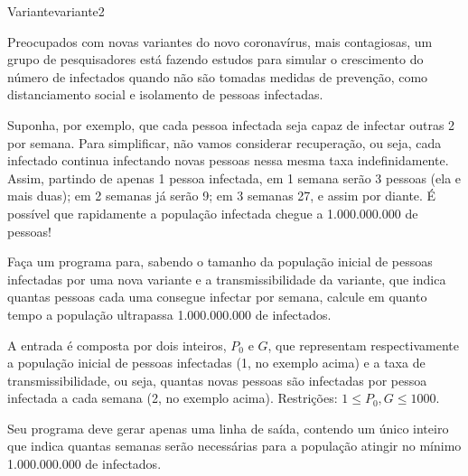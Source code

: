 \documentclass[12pt,a4paper,oneside]{article}
\begin{document}
\begin{problem}{Variante}{variante}{2}

Preocupados com novas variantes do novo coronavírus, mais contagiosas, um grupo de pesquisadores está fazendo estudos para simular o crescimento do número de infectados quando não são tomadas medidas de prevenção, como distanciamento social e isolamento de pessoas infectadas.

Suponha, por exemplo, que cada pessoa infectada seja capaz de infectar outras 2 por semana. Para simplificar, não vamos considerar recuperação, ou seja, cada infectado continua infectando novas pessoas nessa mesma taxa indefinidamente. Assim, partindo de apenas 1 pessoa infectada, em 1 semana serão 3 pessoas (ela e mais duas); em 2 semanas já serão 9; em 3 semanas 27, e assim por diante. É possível que rapidamente a população infectada chegue a 1.000.000.000 de pessoas!

Faça um programa para, sabendo o tamanho da população inicial de pessoas infectadas por uma nova variante e a transmissibilidade da variante, que indica quantas pessoas cada uma consegue infectar por semana, calcule em quanto tempo a população ultrapassa 1.000.000.000 de infectados.

%

\InputFile

A entrada é composta por dois inteiros, $P_0$ e $G$, que representam respectivamente a população inicial de pessoas infectadas (1, no exemplo acima) e a taxa de transmissibilidade, ou seja, quantas novas pessoas são infectadas por pessoa infectada a cada semana (2, no exemplo acima). Restrições: $1 \leq P_0, G \leq 1000$.


\OutputFile

Seu programa deve gerar apenas uma linha de saída, contendo um único inteiro que indica quantas semanas serão necessárias para a população atingir no mínimo 1.000.000.000 de infectados.

\Example

\begin{example}
%
\end{example}

\begin{example}
%
\end{example}

\begin{example}
%
\end{example}

\begin{example}
%
\end{example}


\end{problem}
\end{document}
